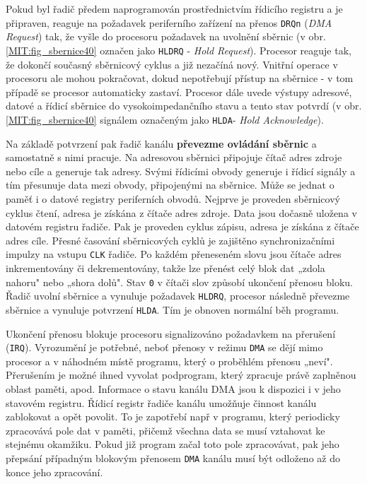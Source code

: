       Pokud byl řadič předem naprogramován prostřednictvím řídicího registru a je připraven, 
      reaguje na požadavek periferního zařízení na přenos \texttt{DRQn} (\emph{DMA Request}) tak, 
      že vyšle do procesoru požadavek na uvolnění sběrnic (v obr. \ref{MIT:fig_sbernice40} označen 
      jako \texttt{HLDRQ} - \emph{Hold Request}). Procesor reaguje tak, že dokončí současný 
      sběrnicový cyklus a již nezačíná nový. Vnitřní operace v procesoru ale mohou pokračovat, 
      dokud nepotřebují přístup na sběrnice - v tom případě se procesor automaticky zastaví. 
      Procesor dále uvede výstupy adresové, datové a řídicí sběrnice do vysokoimpedančního stavu a 
      tento stav potvrdí (v obr. \ref{MIT:fig_sbernice40} signálem označeným jako \texttt{HLDA}- 
      \emph{Hold Acknowledge}).
      
      Na základě potvrzení pak řadič kanálu \textbf{převezme ovládání sběrnic} a samostatně s nimi 
      pracuje. Na adresovou sběrnici připojuje čítač adres zdroje nebo cíle a generuje tak adresy. 
      Svými řídicími obvody generuje i řídicí signály a tím přesunuje data mezi obvody, připojenými 
      na sběrnice. Může se jednat o paměť i o datové registry periferních obvodů. Nejprve je 
      proveden sběrnicový cyklus čtení, adresa je získána z čítače adres zdroje. Data jsou dočasně 
      uložena v datovém registru řadiče. Pak je proveden cyklus zápisu, adresa je získána z čítače 
      adres cíle. Přesné časování sběrnicových cyklů je zajištěno synchronizačními impulzy na 
      vstupu \texttt{CLK} řadiče. Po každém přeneseném slovu jsou čítače adres inkrementovány či 
      dekrementovány, takže lze přenést celý blok dat „zdola nahoru" nebo „shora dolů". Stav 
      \texttt{0} v čítači slov způsobí ukončení přenosu bloku. Řadič uvolní sběrnice a 
      vynuluje požadavek \texttt{HLDRQ}, procesor následně převezme sběrnice a vynuluje potvrzení 
      \texttt{HLDA}. Tím je obnoven normální běh programu.
      
      Ukončení přenosu blokuje procesoru signalizováno požadavkem na přerušení (\texttt{IRQ}). 
      Vyrozumění je potřebné, neboť přenosy v režimu \texttt{DMA} se dějí mimo procesor a v 
      náhodném místě programu, který  o proběhlém přenosu „neví". Přerušením je možné ihned vyvolat 
      podprogram, který zpracuje právě zaplněnou oblast paměti, apod. Informace o stavu kanálu DMA 
      jsou k dispozici i v jeho stavovém registru. Řídicí registr řadiče kanálu umožňuje činnost 
      kanálu zablokovat a opět povolit. To je zapotřebí např v programu, který periodicky 
      zpracovává pole dat v paměti, přičemž všechna data se musí vztahovat ke stejnému okamžiku. 
      Pokud již program začal toto pole zpracovávat, pak jeho přepsání případným blokovým přenosem 
      \texttt{DMA} kanálu musí být odloženo až do konce jeho zpracování.
      
